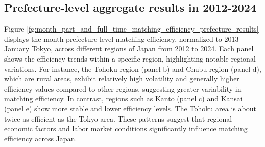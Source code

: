 \documentclass[12pt]{article}
\begin{document}
\subsection{Prefecture-level aggregate results in 2012-2024}

Figure \ref{fg:month_part_and_full_time_matching_efficiency_prefecture_results} displays the month-prefecture level matching efficiency, normalized to 2013 January Tokyo, across different regions of Japan from 2012 to 2024. Each panel shows the efficiency trends within a specific region, highlighting notable regional variations. For instance, the Tohoku region (panel b) and Chubu region (panel d), which are rural areas, exhibit relatively high volatility and generally higher efficiency values compared to other regions, suggesting greater variability in matching efficiency. In contrast, regions such as Kanto (panel c) and Kansai (panel e) show more stable and lower efficiency levels. The Tohoku area is about twice as efficient as the Tokyo area. These patterns suggest that regional economic factors and labor market conditions significantly influence matching efficiency across Japan.
\end{document}

